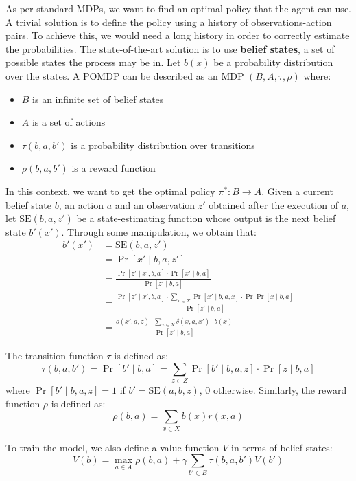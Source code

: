 \documentclass[a4paper, 12pt]{report}
\begin{document}
    As per standard MDPs, we want to find an optimal policy that the agent can use. A trivial solution is to define the policy using a history of observations-action pairs. To achieve this, we would need a long history in order to correctly estimate the probabilities. The state-of-the-art solution is to use \textbf{belief states}, a set of possible states the process may be in. Let $b(x)$ be a probability distribution over the states. A POMDP can be described as an MDP $(B,A,\tau,\rho)$ where:
    \begin{itemize}
        \item $B$ is an infinite set of belief states
        \item $A$ is a set of actions
        \item $\tau(b,a,b')$ is a probability distribution over transitions
        \item $\rho(b,a,b')$ is a reward function
    \end{itemize}

    In this context, we want to get the optimal policy $\pi^* : B \to A$. Given a current belief state $b$, an action $a$ and an observation $z'$ obtained after the execution of $a$, let $\mathrm{SE}(b,a,z')$ be a state-estimating function whose output is the next belief state $b'(x')$. Through some manipulation, we obtain that:
    \[\begin{split}
        b'(x') &= \mathrm{SE}(b,a,z') \\
        &= \Pr[x' \mid b,a,z'] \\
        &= \frac{\Pr[z' \mid x',b,a] \cdot \Pr[x' \mid b,a]}{\Pr[z' \mid b,a]} \\
        &= \frac{\Pr[z' \mid x',b,a] \cdot \sum_{x \in X} \Pr[x' \mid b,a,x] \cdot \Pr \Pr[x \mid b,a]}{\Pr[z' \mid b,a]} \\
        &= \frac{o(x',a,z) \cdot \sum_{x \in X} \delta(x,a,x') \cdot b(x)}{\Pr[z' \mid b,a]}
    \end{split}\]

    The transition function $\tau$ is defined as:
    \[\tau(b,a,b') = \Pr[b' \mid b,a] = \sum_{z \in Z} \Pr[b' \mid b,a,z] \cdot \Pr[z \mid b,a]\]
    where $\Pr[b' \mid b,a,z] = 1$ if $b' = \mathrm{SE}(a,b,z)$, $0$ otherwise. Similarly, the reward function $\rho$ is defined as:
    \[\rho(b,a) = \sum_{x \in X} b(x) r(x,a)\] 

    To train the model, we also define a value function $V$ in terms of belief states:
    \[V(b) = \max_{a \in A} \rho(b,a) + \gamma \sum_{b' \in B} \tau(b,a,b') V(b')\]
\end{document}

